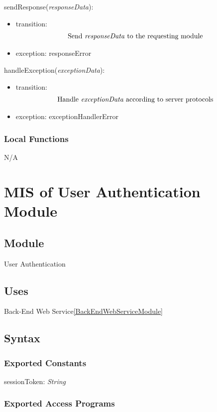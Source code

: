 \documentclass[12pt, titlepage]{article}
\begin{document}
\noindent sendResponse(\textit{responseData}):
\begin{itemize}
\item transition: 
\begin{align*}
\text{Send \textit{responseData} to the requesting module}
\end{align*}

\item exception: responseError
\end{itemize}

\noindent handleException(\textit{exceptionData}):
\begin{itemize}
\item transition: 
\begin{align*}
\text{Handle \textit{exceptionData} according to server protocols}
\end{align*}

\item exception: exceptionHandlerError
\end{itemize}

\subsubsection{Local Functions}
N/A


\newpage
\section{MIS of User Authentication Module} \label{UserAuthenticationModule}

\subsection{Module}
User Authentication

\subsection{Uses}
Back-End Web Service\ref{BackEndWebServiceModule}
\
\subsection{Syntax}

\subsubsection{Exported Constants}
sessionToken: \textit{String}

\subsubsection{Exported Access Programs}
\end{document}

